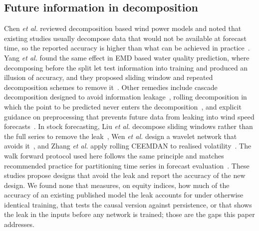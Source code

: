 \subsection{Future information in decomposition}
Chen \emph{et al.} reviewed decomposition based wind power models and noted
that existing studies usually decompose data that would not be available at
forecast time, so the reported accuracy is higher than what can be achieved in
practice~\cite{chen2022}. Yang \emph{et al.} found the same effect in EMD
based water quality prediction, where decomposing before the split let test
information into training and produced an illusion of accuracy, and they
proposed sliding window and repeated decomposition schemes to remove
it~\cite{emdleak2024}. Other remedies include cascade decomposition designed to
avoid information leakage~\cite{wang2024}, rolling decomposition in which the
point to be predicted never enters the decomposition~\cite{yao2025}, and
explicit guidance on preprocessing that prevents future data from leaking into
wind speed forecasts~\cite{pang2026}. In stock forecasting, Liu \emph{et al.}
decompose sliding windows rather than the full series to remove the
leak~\cite{liu2022,liu2024}, Wen \emph{et al.} design a wavelet network that avoids
it~\cite{wen2024}, and Zhang \emph{et al.} apply rolling CEEMDAN to realised
volatility~\cite{zhang2025}. The walk forward protocol used here follows the
same principle and matches recommended practice for partitioning time series
in forecast evaluation~\cite{hewamalage2022}. These studies propose designs that
avoid the leak and report the accuracy of the new design. We found none that
measures, on equity indices, how much of the accuracy of an existing published
model the leak accounts for under otherwise identical training, that tests the
causal version against persistence, or that shows the leak in the inputs before
any network is trained; those are the gaps this paper addresses.

